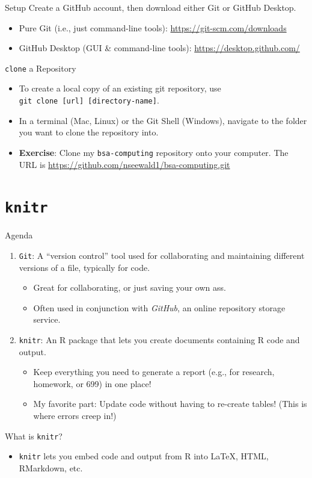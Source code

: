 \documentclass{beamer}
\begin{document}
	\begin{frame}{Setup}
		Create a GitHub account, then download either Git or GitHub Desktop.
		\begin{itemize}
			\item Pure Git (i.e., just command-line tools): \url{https://git-scm.com/downloads}
			\item GitHub Desktop (GUI \& command-line tools): \url{https://desktop.github.com/}
		\end{itemize}
	\end{frame}
	
	\begin{frame}{\texttt{clone} a Repository}
		\begin{itemize}
			\item To create a local copy of an existing git repository, use 
			\\ \texttt{git clone [url] [directory-name]}.
			\item In a terminal (Mac, Linux) or the Git Shell (Windows), navigate to the folder you want to clone the repository into.
			\item \textbf{Exercise}: Clone my \texttt{bsa-computing} repository onto your computer. The URL is \url{https://github.com/nseewald1/bsa-computing.git}
		\end{itemize}
	\end{frame}
	
	\section{\texttt{knitr}}
	
	\begin{frame}{Agenda}
		\begin{enumerate}
			\item \texttt{Git}: A ``version control'' tool used for collaborating and maintaining different versions of a file, typically for code.
			\begin{itemize}
				\item Great for collaborating, or just saving your own ass.
				\item Often used in conjunction with \textit{GitHub}, an online repository storage service.
			\end{itemize}
			
			\item \texttt{knitr}: An R package that lets you create documents containing R code and output.
			\begin{itemize}
				\item Keep everything you need to generate a report (e.g., for research, homework, or 699) in one place!
				\item My favorite part: Update code without having to re-create tables! (This is where errors creep in!)
			\end{itemize}
		\end{enumerate}
	\end{frame}
	
	\begin{frame}{What is \texttt{knitr}?}
		\begin{itemize}
			\item \texttt{knitr} lets you embed code and output from R into \LaTeX, HTML, RMarkdown, etc.
		\end{itemize}
	\end{frame}
	
\end{document}
